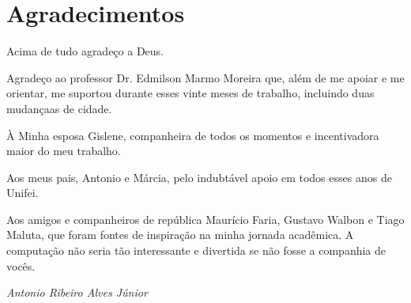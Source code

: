 \chapter*{Agradecimentos}

Acima de tudo agradeço a Deus.

Agradeço ao professor Dr. Edmilson Marmo Moreira que, além de me apoiar e me orientar, me suportou durante esses vinte meses de trabalho, incluindo duas mudançaas de cidade.

À Minha esposa Gislene, companheira de todos os momentos e incentivadora maior do meu trabalho.

Aos meus pais, Antonio e Márcia, pelo indubtável apoio em todos esses anos de Unifei.

Aos amigos e companheiros de república Maurício Faria, Gustavo Walbon e Tiago Maluta, que foram fontes de inspiração na minha jornada acadêmica. A computação não seria tão interessante e divertida se não fosse a companhia de vocês.

\textit{Antonio Ribeiro Alves Júnior}
